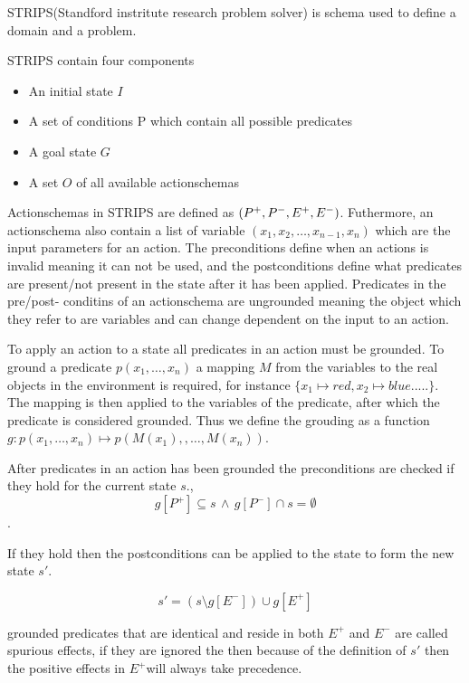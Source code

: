 \documentclass[master.tex]{subfiles}
\begin{document}
    STRIPS(Standford instritute research problem solver) is schema used
    to define a domain and a problem.

    STRIPS contain four components
    \begin{itemize}
    \item An initial state $I$
    \item A set of conditions P which contain all possible predicates
    \item A goal state $G$
    \item A set $O$ of all available actionschemas
    \end{itemize}
    Actionschemas in STRIPS are defined as $\text{\ensuremath{\left(P^{+},P^{-},E^{+},E^{-}\right)}}$.
    Futhermore, an actionschema also contain a list of variable $(x_{1},x_{2},\dots,x_{n-1},x_{n})$
    which are the input parameters for an action. The preconditions define
    when an actions is invalid meaning it can not be used, and the postconditions
    define what predicates are present/not present in the state after
    it has been applied. Predicates in the pre/post- conditins of an actionschema
    are ungrounded meaning the object which they refer to are variables
    and can change dependent on the input to an action.

    To apply an action to a state all predicates in an action must be
    grounded. To ground a predicate $p(x_{1},\dots,x_{n})$ a mapping
    $M$ from the variables to the real objects in the environment is
    required, for instance $\{x_{1}\mapsto red,x_{2}\mapsto blue.....\}$.
    The mapping is then applied to the variables of the predicate, after
    which the predicate is considered grounded. Thus we define the grouding
    as a function $g:p(x_{1},\dots,x_{n})\mapsto p\left(M\left(x_{1}\right),,\dots,M\left(x_{n}\right)\right)$.

    After predicates in an action has been grounded the preconditions
    are checked if they hold for the current state $s$., \\
    \[
    g\left[P^{+}\right]\subseteq s\,\land\, g\left[P^{-}\right]\cap s=\emptyset
    \]
    .

    If they hold then the postconditions can be applied to the state to
    form the new state $s'$.

    \[
    s'=\left(s\setminus g\left[E^{-}\right]\right)\cup g\left[E^{+}\right]
    \]


    grounded predicates that are identical and reside in both $E^{+}$
    and $E^{-}$ are called spurious effects, if they are ignored the
    then because of the definition of $s'$ then the positive effects
    in $E^{+}$will always take precedence.
\end{document}
